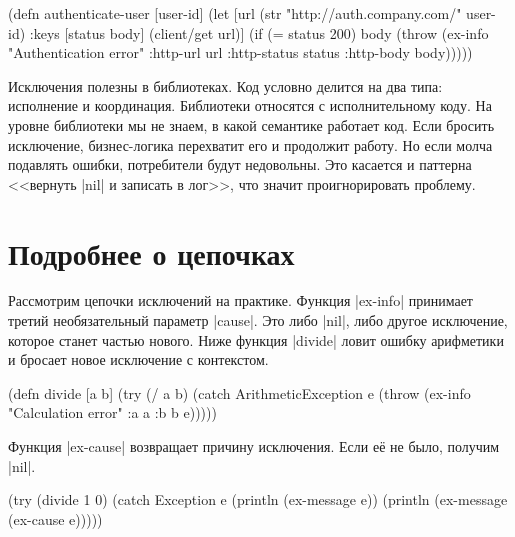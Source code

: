 \begin{english}
  \begin{clojure}
(defn authenticate-user [user-id]
  (let [url (str "http://auth.company.com/" user-id)
        {:keys [status body]} (client/get url)]
    (if (= status 200)
      body
      (throw (ex-info "Authentication error"
                      {:http-url url
                       :http-status status
                       :http-body body})))))
  \end{clojure}
\end{english}

Исключения полезны в библиотеках. Код условно делится на два типа: исполнение и
координация. Библиотеки относятся с исполнительному коду. На уровне библиотеки
мы не знаем, в какой семантике работает код. Если бросить исключение,
бизнес-логика перехватит его и продолжит работу. Но если молча подавлять ошибки,
потребители будут недовольны. Это касается и паттерна <<вернуть \spverb|nil| и
записать в лог>>, что значит проигнорировать проблему.

\section{Подробнее о цепочках}


Рассмотрим цепочки исключений на практике. Функция \spverb|ex-info|
принимает третий необязательный параметр \spverb|cause|. Это либо \spverb|nil|,
либо другое исключение, которое станет частью нового. Ниже функция
\spverb|divide| ловит ошибку арифметики и бросает новое исключение с контекстом.


\label{re-throw-example}

\begin{english}
  \begin{clojure}
(defn divide [a b]
  (try
    (/ a b)
    (catch ArithmeticException e
      (throw (ex-info
              "Calculation error"
              {:a a :b b}
              e)))))
  \end{clojure}
\end{english}

Функция \spverb|ex-cause| возвращает причину исключения. Если е\"{е} не было,
получим \spverb|nil|.

\begin{english}
  \begin{clojure}
(try
  (divide 1 0)
  (catch Exception e
    (println (ex-message e))
    (println (ex-message (ex-cause e)))))
  \end{clojure}
\end{english}

